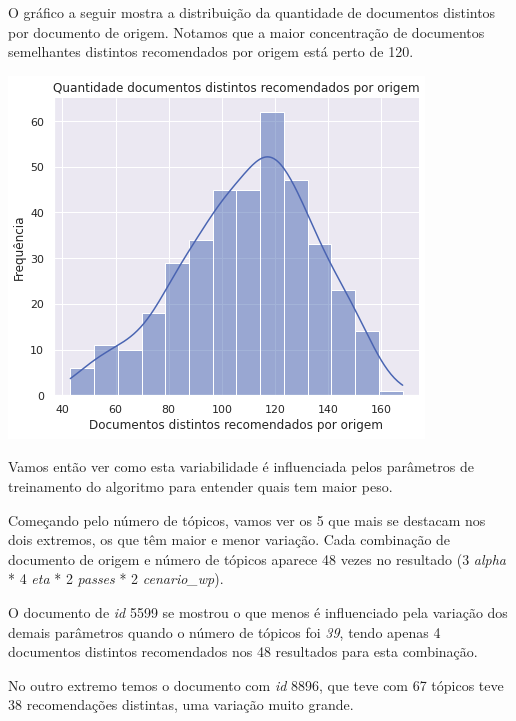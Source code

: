 O gráfico a seguir mostra a distribuição da quantidade de documentos distintos por documento de origem. Notamos que a maior concentração
de documentos semelhantes distintos recomendados por origem está perto de 120.

\includegraphics[scale=0.7]{resultados/resources/distribuicao_semelhantes_distintos.png}

Vamos então ver como esta variabilidade é influenciada pelos parâmetros de treinamento do algoritmo para entender quais tem maior peso.

Começando pelo número de tópicos, vamos ver os 5 que mais se destacam nos dois extremos, os que têm maior e menor variação. Cada combinação de 
documento de origem e número de tópicos aparece 48 vezes no resultado (3 \textit{alpha} * 4 \textit{eta} * 2 \textit{passes} * 2 \textit{cenario\_wp}).

O documento de \textit{id} 5599 se mostrou o que menos é influenciado pela variação dos demais parâmetros quando o número de tópicos foi
\textit{39}, tendo apenas 4 documentos distintos recomendados nos 48 resultados para esta combinação.

No outro extremo temos o documento com \textit{id} 8896, que teve com 67 tópicos teve 38 recomendações distintas, uma variação muito grande.

